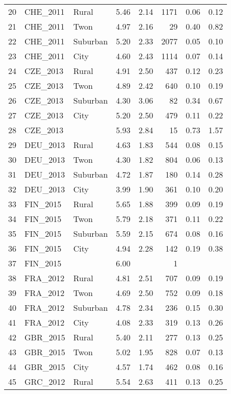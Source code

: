 \documentclass[12pt, titlepage]{article}
\begin{document}
\begin{table}[ht]
\begin{tabular}{rllrrrrr}
		20 & CHE\_2011 & Rural & 5.46 & 2.14 & 1171 & 0.06 & 0.12 \\ 
		21 & CHE\_2011 & Twon & 4.97 & 2.16 &  29 & 0.40 & 0.82 \\ 
		22 & CHE\_2011 & Suburban & 5.20 & 2.33 & 2077 & 0.05 & 0.10 \\ 
		23 & CHE\_2011 & City & 4.60 & 2.43 & 1114 & 0.07 & 0.14 \\ 
		24 & CZE\_2013 & Rural & 4.91 & 2.50 & 437 & 0.12 & 0.23 \\ 
		25 & CZE\_2013 & Twon & 4.89 & 2.42 & 640 & 0.10 & 0.19 \\ 
		26 & CZE\_2013 & Suburban & 4.30 & 3.06 &  82 & 0.34 & 0.67 \\ 
		27 & CZE\_2013 & City & 5.20 & 2.50 & 479 & 0.11 & 0.22 \\ 
		28 & CZE\_2013 &  & 5.93 & 2.84 &  15 & 0.73 & 1.57 \\ 
		29 & DEU\_2013 & Rural & 4.63 & 1.83 & 544 & 0.08 & 0.15 \\ 
		30 & DEU\_2013 & Twon & 4.30 & 1.82 & 804 & 0.06 & 0.13 \\ 
		31 & DEU\_2013 & Suburban & 4.72 & 1.87 & 180 & 0.14 & 0.28 \\ 
		32 & DEU\_2013 & City & 3.99 & 1.90 & 361 & 0.10 & 0.20 \\ 
		33 & FIN\_2015 & Rural & 5.65 & 1.88 & 399 & 0.09 & 0.19 \\ 
		34 & FIN\_2015 & Twon & 5.79 & 2.18 & 371 & 0.11 & 0.22 \\ 
		35 & FIN\_2015 & Suburban & 5.59 & 2.15 & 674 & 0.08 & 0.16 \\ 
		36 & FIN\_2015 & City & 4.94 & 2.28 & 142 & 0.19 & 0.38 \\ 
		37 & FIN\_2015 &  & 6.00 &  &   1 &  &  \\ 
		38 & FRA\_2012 & Rural & 4.81 & 2.51 & 707 & 0.09 & 0.19 \\ 
		39 & FRA\_2012 & Twon & 4.69 & 2.50 & 752 & 0.09 & 0.18 \\ 
		40 & FRA\_2012 & Suburban & 4.78 & 2.34 & 236 & 0.15 & 0.30 \\ 
		41 & FRA\_2012 & City & 4.08 & 2.33 & 319 & 0.13 & 0.26 \\ 
		42 & GBR\_2015 & Rural & 5.40 & 2.11 & 277 & 0.13 & 0.25 \\ 
		43 & GBR\_2015 & Twon & 5.02 & 1.95 & 828 & 0.07 & 0.13 \\ 
		44 & GBR\_2015 & City & 4.57 & 1.74 & 462 & 0.08 & 0.16 \\ 
		45 & GRC\_2012 & Rural & 5.54 & 2.63 & 411 & 0.13 & 0.25 \\ 

\end{tabular}
\end{table}
\end{document}
